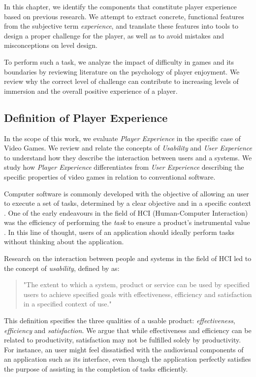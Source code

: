 In this chapter, we identify the components that constitute player experience based on previous research. We attempt to extract concrete, functional features from the subjective term \emph{experience}, and translate these features into tools to design a proper challenge for the player, as well as to avoid mistakes and misconceptions on level design.

To perform such a task, we analyze the impact of difficulty in games and its boundaries by reviewing literature on the psychology of player enjoyment. We review why the correct level of challenge can contribute to increasing levels of immersion and the overall positive experience of a player.

\subsection{Definition of Player Experience}

In the scope of this work, we evaluate \emph{Player Experience} in the specific case of Video Games. We review and relate the concepts of \emph{Usability} and \emph{User Experience} to understand how they describe the interaction between users and a systems. We study how \emph{Player Experience} differentiates from \emph{User Experience} describing the specific properties of video games in relation to conventional software.

Computer software is commonly developed with the objective of allowing an user to execute a set of tasks, determined by a clear objective and in a specific context \cite{ARTICLE_FromUsabilityToPlayability}. One of the early endeavours in the field of HCI (Human-Computer Interaction) was the efficiency of performing the \emph{task} to ensure a product's instrumental value \cite{ARTICLE_UserExperienceAResearchAgenda}.  In this line of thought, users of an application should ideally perform tasks without thinking about the application. 

Research on the interaction between people and systems in the field of HCI led to the concept of \emph{usability}, defined by \cite{ISO_ISO92411} as:

\begin{quotation}
"The extent to which a system, product or service can be used by specified users to achieve specified goals with effectiveness, efficiency and satisfaction in a specified context of use."
\end{quotation}

This definition specifies the three qualities of a usable product: \emph{effectiveness}, \emph{efficiency} and \emph{satisfaction}. We argue that while effectiveness and efficiency can be related to productivity,  satisfaction may not be fulfilled solely by productivity. For instance, an user might feel dissatisfied with the audiovisual components of an application such as its interface, even though the application perfectly satisfies the purpose of assisting in the completion of tasks efficiently.

